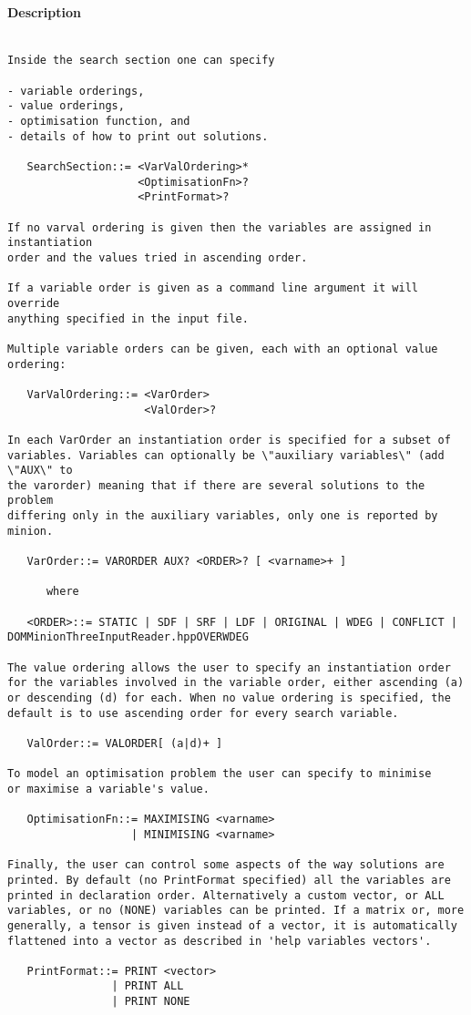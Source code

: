 \paragraph{Description}
{\footnotesize
\begin{verbatim}

Inside the search section one can specify

- variable orderings, 
- value orderings,
- optimisation function, and
- details of how to print out solutions.

   SearchSection::= <VarValOrdering>*
                    <OptimisationFn>?
                    <PrintFormat>?

If no varval ordering is given then the variables are assigned in instantiation
order and the values tried in ascending order.

If a variable order is given as a command line argument it will override
anything specified in the input file.

Multiple variable orders can be given, each with an optional value ordering:

   VarValOrdering::= <VarOrder> 
                     <ValOrder>?

In each VarOrder an instantiation order is specified for a subset of
variables. Variables can optionally be \"auxiliary variables\" (add \"AUX\" to
the varorder) meaning that if there are several solutions to the problem
differing only in the auxiliary variables, only one is reported by minion.

   VarOrder::= VARORDER AUX? <ORDER>? [ <varname>+ ]

      where

   <ORDER>::= STATIC | SDF | SRF | LDF | ORIGINAL | WDEG | CONFLICT | DOMMinionThreeInputReader.hppOVERWDEG

The value ordering allows the user to specify an instantiation order
for the variables involved in the variable order, either ascending (a)
or descending (d) for each. When no value ordering is specified, the
default is to use ascending order for every search variable.

   ValOrder::= VALORDER[ (a|d)+ ]

To model an optimisation problem the user can specify to minimise
or maximise a variable's value.

   OptimisationFn::= MAXIMISING <varname>
                   | MINIMISING <varname>

Finally, the user can control some aspects of the way solutions are
printed. By default (no PrintFormat specified) all the variables are
printed in declaration order. Alternatively a custom vector, or ALL
variables, or no (NONE) variables can be printed. If a matrix or, more
generally, a tensor is given instead of a vector, it is automatically
flattened into a vector as described in 'help variables vectors'.

   PrintFormat::= PRINT <vector>
                | PRINT ALL
                | PRINT NONE
\end{verbatim}
}

